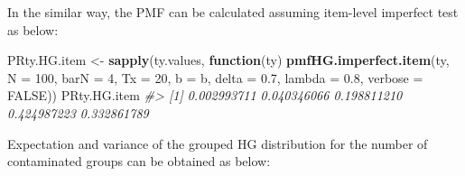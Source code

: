 \documentclass[
]{article}
\newenvironment{Shaded}{\begin{snugshade}}{\end{snugshade}}
\newcommand{\AttributeTok}[1]{\textcolor[rgb]{0.13,0.29,0.53}{#1}}
\newcommand{\CommentTok}[1]{\textcolor[rgb]{0.56,0.35,0.01}{\textit{#1}}}
\newcommand{\ConstantTok}[1]{\textcolor[rgb]{0.56,0.35,0.01}{#1}}
\newcommand{\ControlFlowTok}[1]{\textcolor[rgb]{0.13,0.29,0.53}{\textbf{#1}}}
\newcommand{\DecValTok}[1]{\textcolor[rgb]{0.00,0.00,0.81}{#1}}
\newcommand{\FloatTok}[1]{\textcolor[rgb]{0.00,0.00,0.81}{#1}}
\newcommand{\FunctionTok}[1]{\textcolor[rgb]{0.13,0.29,0.53}{\textbf{#1}}}
\newcommand{\NormalTok}[1]{#1}
\newcommand{\OtherTok}[1]{\textcolor[rgb]{0.56,0.35,0.01}{#1}}
\newcommand{\SpecialCharTok}[1]{\textcolor[rgb]{0.81,0.36,0.00}{\textbf{#1}}}
\newcommand{\StringTok}[1]{\textcolor[rgb]{0.31,0.60,0.02}{#1}}
\begin{document}
In the similar way, the PMF can be calculated assuming item-level
imperfect test as below:

\begin{Shaded}
\begin{Highlighting}[]
\NormalTok{PRty.HG.item }\OtherTok{\textless{}{-}} \FunctionTok{sapply}\NormalTok{(ty.values, }\ControlFlowTok{function}\NormalTok{(ty) }\FunctionTok{pmfHG.imperfect.item}\NormalTok{(ty,}
    \AttributeTok{N =} \DecValTok{100}\NormalTok{, }\AttributeTok{barN =} \DecValTok{4}\NormalTok{, }\AttributeTok{Tx =} \DecValTok{20}\NormalTok{, }\AttributeTok{b =}\NormalTok{ b, }\AttributeTok{delta =} \FloatTok{0.7}\NormalTok{, }\AttributeTok{lambda =} \FloatTok{0.8}\NormalTok{,}
    \AttributeTok{verbose =} \ConstantTok{FALSE}\NormalTok{))}
\NormalTok{PRty.HG.item}
\CommentTok{\#\textgreater{} [1] 0.002993711 0.040346066 0.198811210 0.424987223 0.332861789}
\end{Highlighting}
\end{Shaded}

Expectation and variance of the grouped HG distribution for the number
of contaminated groups can be obtained as below:

\begin{Shaded}
\end{Shaded}
\end{document}
